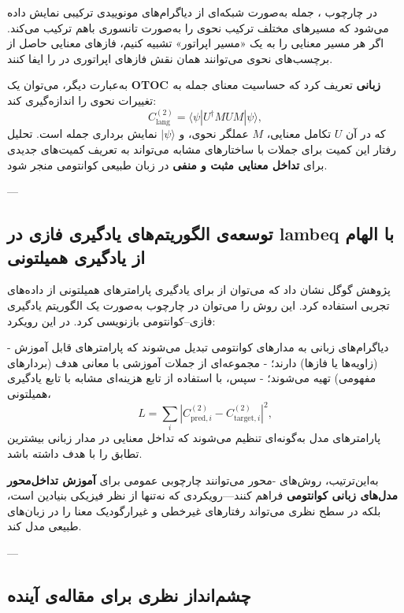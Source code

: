 در چارچوب ، جمله به‌صورت شبکه‌ای از دیاگرام‌های مونوییدی ترکیبی نمایش داده می‌شود که مسیرهای مختلف ترکیب نحوی را به‌صورت تانسوری باهم ترکیب می‌کند. اگر هر مسیر معنایی را به یک «مسیر اپراتور» تشبیه کنیم، فازهای معنایی حاصل از برچسب‌های نحوی می‌توانند همان نقش فازهای اپراتوری در  را ایفا کنند.

به‌عبارت دیگر، می‌توان یک \textbf{OTOC زبانی} تعریف کرد که حساسیت معنای جمله به تغییرات نحوی را اندازه‌گیری کند:
\[
C^{(2)}_{\text{lang}} = \langle \psi | U^\dagger M U M | \psi \rangle,
\]
که در آن \(U\) تکامل معنایی، \(M\) عملگر نحوی، و \(|\psi\rangle\) نمایش برداری جمله است.  
تحلیل رفتار این کمیت برای جملات با ساختارهای مشابه می‌تواند به تعریف کمیت‌های جدیدی برای \textbf{تداخل معنایی مثبت و منفی} در زبان طبیعی کوانتومی منجر شود.

---

\subsection{توسعه‌ی الگوریتم‌های یادگیری فازی در lambeq با الهام از یادگیری همیلتونی}

پژوهش گوگل نشان داد که می‌توان از  برای یادگیری پارامترهای همیلتونی از داده‌های تجربی استفاده کرد.  
این روش را می‌توان در چارچوب  به‌صورت یک الگوریتم یادگیری فازی–کوانتومی بازنویسی کرد. در این رویکرد:

- دیاگرام‌های زبانی  به مدارهای کوانتومی تبدیل می‌شوند که پارامترهای قابل آموزش (زاویه‌ها یا فازها) دارند؛  
- مجموعه‌ای از جملات آموزشی با معانی هدف (بردارهای مفهومی) تهیه می‌شوند؛  
- سپس، با استفاده از تابع هزینه‌ای مشابه با تابع یادگیری همیلتونی،
\[
L = \sum_i \left| C^{(2)}_{\text{pred},i} - C^{(2)}_{\text{target},i} \right|^2,
\]
پارامترهای مدل به‌گونه‌ای تنظیم می‌شوند که تداخل معنایی در مدار زبانی بیشترین تطابق را با هدف داشته باشد.

به‌این‌ترتیب، روش‌های -محور می‌توانند چارچوبی عمومی برای \textbf{آموزش تداخل‌محور مدل‌های زبانی کوانتومی} فراهم کنند—رویکردی که نه‌تنها از نظر فیزیکی بنیادین است، بلکه در سطح نظری می‌تواند رفتارهای غیرخطی و غیرارگودیک معنا را در زبان‌های طبیعی مدل کند.

---

\subsection{چشم‌انداز نظری برای مقاله‌ی آینده}

